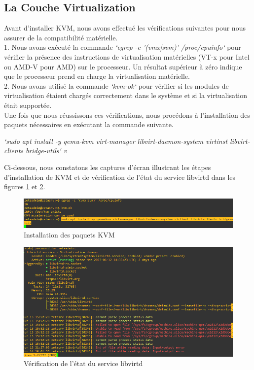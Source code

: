 \subsection{La Couche Virtualization}

Avant d'installer KVM, nous avons effectué les vérifications suivantes pour nous assurer de la compatibilité matérielle. \\

1. Nous avons exécuté la commande \textit{`egrep -c '(vmx|svm)' /proc/cpuinfo` } pour vérifier la présence des instructions de virtualisation matérielles (VT-x pour Intel ou AMD-V pour AMD) sur le processeur. Un résultat supérieur à zéro indique que le processeur prend en charge la virtualisation matérielle. \\

2. Nous avons utilisé la commande \textit{`kvm-ok`} pour vérifier si les modules de virtualisation étaient chargés correctement dans le système et si la virtualisation était supportée. \\

Une fois que nous réussissons ces vérifications, nous procédons à l'installation des paquets nécessaires en exécutant la commande suivante.

\textit{`sudo apt install -y qemu-kvm virt-manager libvirt-daemon-system virtinst libvirt-clients bridge-utils` v}


Ci-dessous, nous constatons les captures d'écran illustrant les étapes d'installation de KVM et de vérification de l'état du service libvirtd dans les figures  \ref{fig:kvm-installation} et \ref{fig:libvirtd-status}.

\begin{figure}[H]
 \centering
    \includegraphics[width=15cm]{Images/installkvm1.png}
    \caption{Installation des paquets KVM}
    \label{fig:kvm-installation}
\end{figure}

\begin{figure}[H]
 \centering
    \includegraphics[width=15cm]{Images/installkvm2.png}
    \caption{Vérification de l'état du service libvirtd}
    \label{fig:libvirtd-status}
\end{figure}




